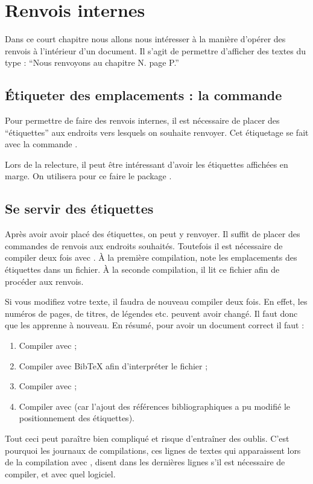 \chapter{Renvois internes}\label{label}

\begin{prealable}
Dans ce court chapitre nous allons nous intéresser à la manière d'opérer des renvois à l'intérieur d'un document.
Il s'agit de permettre d'afficher des textes du type : \enquote{Nous renvoyons au chapitre N. page P.}
\end{prealable}

\section{Étiqueter des  emplacements : la commande }

Pour permettre de faire des renvois internes, il est nécessaire de placer des \enquote{étiquettes} aux endroits vers lesquels on souhaite renvoyer.
Cet étiquetage  se fait avec la commande .

\begin{plusloins}
Lors de la relecture, il peut être intéressant d'avoir les étiquettes affichées en marge. On utilisera pour ce faire le package .
\end{plusloins}

\section{Se servir des étiquettes}

Après avoir avoir placé des étiquettes, on peut y renvoyer. 
Il suffit de placer des commandes de renvois aux endroits souhaités. 
Toutefois il est nécessaire de compiler deux fois avec \XeLaTeX{}.
À la première compilation,   \XeLaTeX{}%
note les emplacements des étiquettes dans un fichier. À la seconde compilation, il lit ce fichier afin de procéder aux renvois. 

\begin{attention}
	Si vous modifiez votre texte, il faudra de nouveau compiler deux fois. En effet, les numéros de pages, de titres, de légendes etc. peuvent avoir changé. Il faut donc  que \XeLaTeX{} les apprenne à nouveau. En résumé, pour avoir un document correct il faut :
	\begin{enumerate}
		\item Compiler avec \XeLaTeX{};
		\item Compiler avec BibTeX afin d'interpréter le fichier ;
		\item Compiler avec \XeLaTeX{};
		\item Compiler avec \XeLaTeX{} (car l'ajout des références bibliographiques a pu modifié le positionnement des étiquettes).
	\end{enumerate}
	
	Tout ceci peut paraître bien compliqué et risque d'entraîner des oublis. C'est pourquoi les journaux de compilations, ces lignes de textes qui apparaissent lors de la compilation avec \XeLaTeX{}, disent dans les dernières lignes s'il est nécessaire de compiler, et avec quel logiciel.
\end{attention}


